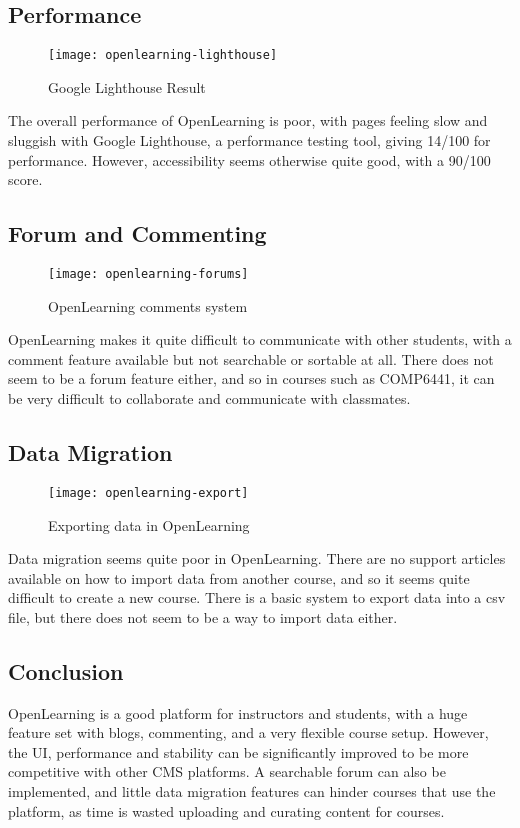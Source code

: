 \subsection{Performance}
\begin{figure}[h!]
    \centering
    \texttt{[image: openlearning-lighthouse]}
    \caption{Google Lighthouse Result}
\end{figure}
The overall performance of OpenLearning is poor, with pages feeling slow and sluggish with Google Lighthouse, a performance testing tool, giving 14/100 for performance. However, accessibility seems otherwise quite good, with a 90/100 score. \\

\subsection{Forum and Commenting}
\begin{figure}[h!]
    \centering
    \texttt{[image: openlearning-forums]}
    \caption{OpenLearning comments system}
\end{figure}
OpenLearning makes it quite difficult to communicate with other students, with a comment feature available but not searchable or sortable at all. There does not seem to be a forum feature either, and so in courses such as COMP6441, it can be very difficult to collaborate and communicate with classmates. \\


\subsection{Data Migration}
\begin{figure}[h!]
    \centering
    \texttt{[image: openlearning-export]}
    \caption{Exporting data in OpenLearning}
\end{figure}
Data migration seems quite poor in OpenLearning. There are no support articles available on how to import data from another course, and so it seems quite difficult to create a new course. There is a basic system to export data into a csv file, but there does not seem to be a way to import data either.

\subsection{Conclusion}
OpenLearning is a good platform for instructors and students, with a huge feature set with blogs, commenting, and a very flexible course setup. However, the UI, performance and stability can be significantly improved to be more competitive with other CMS platforms. A searchable forum can also be implemented, and little data migration features can hinder courses that use the platform, as time is wasted uploading and curating content for courses.

